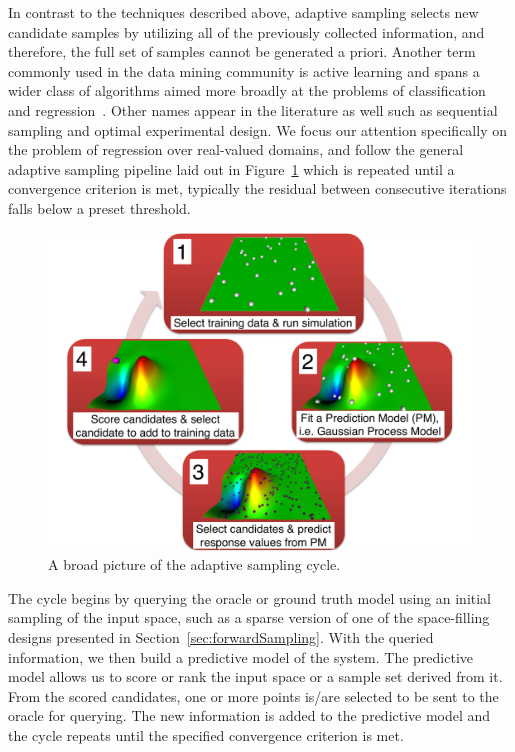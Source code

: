 In contrast to the techniques described above, adaptive sampling selects new candidate samples by utilizing all of the previously collected information, and therefore, the full set of samples cannot be generated a priori.
%
Another term commonly used in the data mining community is active learning and spans a wider class of algorithms aimed more broadly at the problems of classification and regression~\cite{Settles2009}.
%
Other names appear in the literature as well such as sequential sampling and optimal experimental design.
%
We focus our attention specifically on the problem of regression over real-valued domains, and follow the general adaptive sampling pipeline laid out in Figure~\ref{fig:asCycle} which is repeated until a convergence criterion is met, typically the residual between consecutive iterations falls below a preset threshold.

\begin{figure}[t]
  \centering
  \includegraphics[width=.75\textwidth]{figs/chap3/pipeline}
  \caption[Adaptive Sampling Cycle]{A broad picture of the adaptive sampling
  cycle.}
  \label{fig:asCycle}
\end{figure}

The cycle begins by querying the oracle or ground truth model using an initial sampling of the input space, such as a sparse version of one of the space-filling designs presented in Section~\ref{sec:forwardSampling}.
%
With the queried information, we then build a predictive model of the system.
%
%
The predictive model allows us to score or rank the input space or a sample set derived from it.
%
From the scored candidates, one or more points is/are selected to be sent to the oracle for querying.
%
The new information is added to the predictive model and the cycle repeats until the specified convergence criterion is met.

